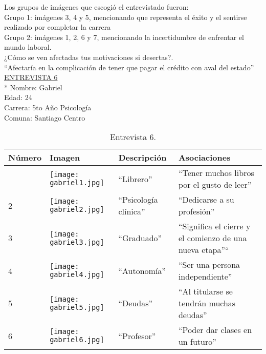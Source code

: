Los grupos de imágenes que escogió el entrevistado fueron:\\

Grupo 1: imágenes 3, 4 y 5, mencionando que representa el éxito y el sentirse realizado por completar la carrera \\

Grupo 2: imágenes 1, 2, 6 y 7, mencionando la incertidumbre de enfrentar el mundo laboral.\\


¿Cómo se ven afectadas tus motivaciones si desertas?.\\

``Afectaría en la complicación de tener que pagar el crédito con aval del estado''\\

\newpage
\underline {ENTREVISTA 6}\\*
Nombre: Gabriel\\
Edad: 24\\
Carrera: 5to Año Psicología\\
Comuna: Santiago Centro\\

\begin{table}[H]
\centering
\begin{tabular}{>{\centering\arraybackslash}m{1cm} >{\centering\arraybackslash}m{2cm} >{\arraybackslash}m{5cm}>{\arraybackslash}m{5cm}}
\hline
Número  & Imagen & Descripción & Asociaciones \\
\hline \hline

1 & \texttt{[image: gabriel1.jpg]} & ``Librero'' & ``Tener muchos libros por el gusto de leer'' \\
\hline

2 & \texttt{[image: gabriel2.jpg]} & ``Psicología clínica'' & ``Dedicarse a su profesión'' \\
\hline

3 & \texttt{[image: gabriel3.jpg]} & ``Graduado'' & ``Significa el cierre y el comienzo de una nueva etapa''`` \\
\hline

4 & \texttt{[image: gabriel4.jpg]} & ``Autonomía'' & ``Ser una persona independiente'' \\
\hline

5 & \texttt{[image: gabriel5.jpg]} & ``Deudas'' & ``Al titularse se tendrán muchas deudas'' \\
\hline

6 & \texttt{[image: gabriel6.jpg]} & ``Profesor'' & ``Poder dar clases en un futuro''\\
\hline


\end{tabular}
\caption{Entrevista 6.}
\label{tabla:gabriel}
\end{table}

